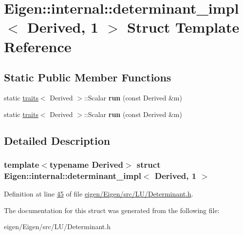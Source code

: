 \hypertarget{struct_eigen_1_1internal_1_1determinant__impl_3_01_derived_00_011_01_4}{}\section{Eigen\+:\+:internal\+:\+:determinant\+\_\+impl$<$ Derived, 1 $>$ Struct Template Reference}
\label{struct_eigen_1_1internal_1_1determinant__impl_3_01_derived_00_011_01_4}
\subsection*{Static Public Member Functions}
\begin{DoxyCompactItemize}
\item 
\mbox{\label{struct_eigen_1_1internal_1_1determinant__impl_3_01_derived_00_011_01_4_a17a08ce77c44a521ab5eb242e00c75e2}} 
static \hyperlink{struct_eigen_1_1internal_1_1traits}{traits}$<$ Derived $>$\+::Scalar {\bfseries run} (const Derived \&m)
\item 
\mbox{\label{struct_eigen_1_1internal_1_1determinant__impl_3_01_derived_00_011_01_4_a17a08ce77c44a521ab5eb242e00c75e2}} 
static \hyperlink{struct_eigen_1_1internal_1_1traits}{traits}$<$ Derived $>$\+::Scalar {\bfseries run} (const Derived \&m)
\end{DoxyCompactItemize}


\subsection{Detailed Description}
\subsubsection*{template$<$typename Derived$>$\newline
struct Eigen\+::internal\+::determinant\+\_\+impl$<$ Derived, 1 $>$}



Definition at line \hyperlink{eigen_2_eigen_2src_2_l_u_2_determinant_8h_source_l00045}{45} of file \hyperlink{eigen_2_eigen_2src_2_l_u_2_determinant_8h_source}{eigen/\+Eigen/src/\+L\+U/\+Determinant.\+h}.



The documentation for this struct was generated from the following file\+:\begin{DoxyCompactItemize}
\item 
eigen/\+Eigen/src/\+L\+U/\+Determinant.\+h\end{DoxyCompactItemize}
